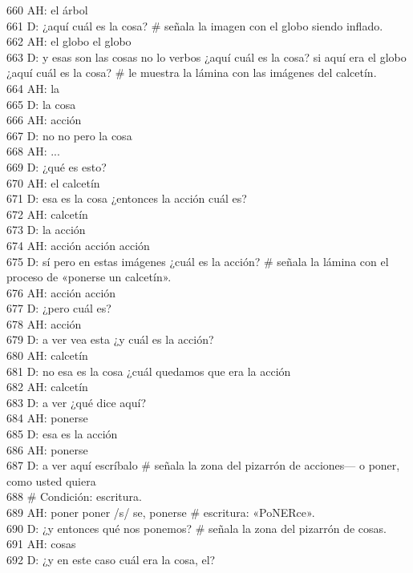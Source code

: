 660 AH: el árbol\\
661 D: ¿aquí cuál es la cosa? \# señala la imagen con el globo siendo inflado.\\
662 AH: el globo el globo\\
663 D: y esas son las cosas no lo verbos ¿aquí cuál es la cosa? si aquí era el globo ¿aquí cuál es la cosa? \# le muestra la lámina con las imágenes del calcetín.\\
664 AH: la\\
665 D: la cosa\\
666 AH: acción\\
667 D: no no pero la cosa\\
668 AH: ...\\
669 D: ¿qué es esto?\\
670 AH: el calcetín\\
671 D: esa es la cosa ¿entonces la acción cuál es?\\
672 AH: calcetín\\
673 D: la acción\\
674 AH: acción acción acción\\
675 D: sí pero en estas imágenes ¿cuál es la acción? \# señala la lámina con el proceso de «ponerse un calcetín».\\
676 AH: acción acción\\
677 D: ¿pero cuál es?\\
678 AH: acción\\
679 D: a ver vea esta ¿y cuál es la acción?\\
680 AH: calcetín\\
681 D: no esa es la cosa ¿cuál quedamos que era la acción\\
682 AH: calcetín\\
683 D: a ver ¿qué dice aquí?\\
684 AH: ponerse\\
685 D: esa es la acción\\
686 AH: ponerse\\
687 D: a ver aquí escríbalo \# señala la zona del pizarrón de acciones--- o poner, como usted quiera\\
688 \# Condición: escritura.\\
689 AH: poner poner /s/ se, ponerse \# escritura: «PoNERce».\\
690 D: ¿y entonces qué nos ponemos? \# señala la zona del pizarrón de cosas.\\
691 AH: cosas\\
692 D: ¿y en este caso cuál era la cosa, el?\\
